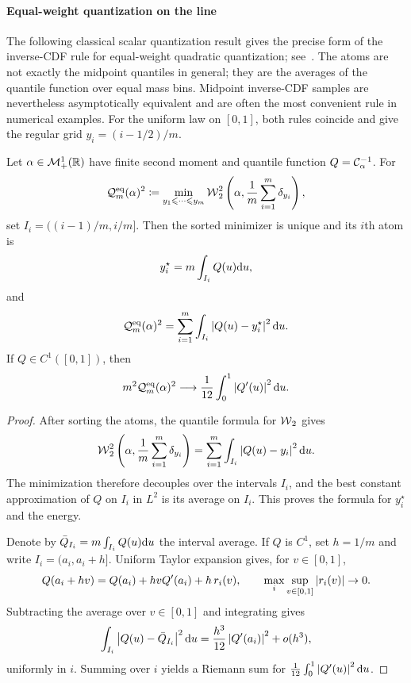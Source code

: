 \paragraph{Equal-weight quantization on the line}
The following classical scalar quantization result gives the precise form of the inverse-CDF rule for equal-weight quadratic quantization; see~\cite{graf2000foundationsquantization}. The atoms are not exactly the midpoint quantiles in general; they are the averages of the quantile function over equal mass bins. Midpoint inverse-CDF samples are nevertheless asymptotically equivalent and are often the most convenient rule in numerical examples. For the uniform law on $[0,1]$, both rules coincide and give the regular grid $y_i=(i-1/2)/m$.

\begin{prop}\label{prop-1d-equal-weight-quantization}
	Let $\alpha\in\mathcal{M}_+^1(\mathbb{R})$ have finite second moment and quantile function $Q=\mathcal{C}_{\alpha}^{-1}$. For
	\[
		\mathcal{Q}^{\mathrm{eq}}_m(\alpha)^2
		\coloneqq
		\min_{y_1\leqslant\cdots\leqslant y_m}
		\operatorname{\mathcal{W}}_2^2\left(\alpha,\frac1m\sum_{i=1}^m\delta_{y_i}\right),
	\]
	set $I_i=((i-1)/m,i/m]$. Then the sorted minimizer is unique and its $i$th atom is
	\[
		y_i^\star
		=
		m\int_{I_i} Q(u)\mathrm{d} u,
	\]
	and
	\[
		\mathcal{Q}^{\mathrm{eq}}_m(\alpha)^2
		=
		\sum_{i=1}^m
		\int_{I_i}
		\left\lvert Q(u)-y_i^\star\right\rvert^2\mathrm{d} u.
	\]
	If $Q\in C^1([0,1])$, then
	\[
		m^2\mathcal{Q}^{\mathrm{eq}}_m(\alpha)^2
		\longrightarrow
		\frac1{12}\int_0^1\left\lvert Q'(u)\right\rvert^2\mathrm{d} u.
	\]
\end{prop}
\begin{proof}
	After sorting the atoms, the quantile formula for $\operatorname{\mathcal{W}}_2$ gives
	\[
		\operatorname{\mathcal{W}}_2^2\left(\alpha,\frac1m\sum_{i=1}^m\delta_{y_i}\right)
		=
		\sum_{i=1}^m
		\int_{I_i}\left\lvert Q(u)-y_i\right\rvert^2\mathrm{d} u.
	\]
	The minimization therefore decouples over the intervals $I_i$, and the best constant approximation of $Q$ on $I_i$ in $L^2$ is its average on $I_i$. This proves the formula for $y_i^\star$ and the energy.

	Denote by $\bar Q_{I_i}=m\int_{I_i}Q(u)\mathrm{d} u$ the interval average. If $Q$ is $C^1$, set $h=1/m$ and write $I_i=(a_i,a_i+h]$. Uniform Taylor expansion gives, for $v\in[0,1]$,
	\[
		Q(a_i+hv)=Q(a_i)+hvQ'(a_i)+h\,r_i(v),
		\qquad
		\max_i\sup_{v\in[0,1]}\left\lvert r_i(v)\right\rvert\to0.
	\]
	Subtracting the average over $v\in[0,1]$ and integrating gives
	\[
		\int_{I_i}\left\lvert Q(u)-\bar Q_{I_i}\right\rvert^2\mathrm{d} u
		=
		\frac{h^3}{12}\left\lvert Q'(a_i)\right\rvert^2+o(h^3),
	\]
	uniformly in $i$. Summing over $i$ yields a Riemann sum for $\frac1{12}\int_0^1\left\lvert Q'(u)\right\rvert^2\mathrm{d} u$.
\end{proof}


